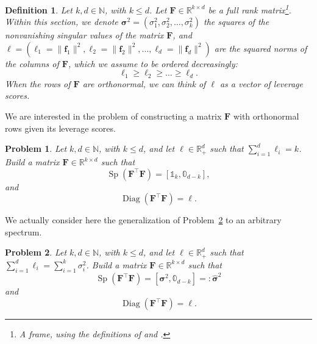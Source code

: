 \documentclass[twoside,11pt]{book}
\newtheorem{definition}{Definition}
\newtheorem{problem}{Problem}
\numberwithin{theorem}{chapter}
\numberwithin{definition}{chapter}
\numberwithin{proposition}{chapter}
\numberwithin{corollary}{chapter}
\numberwithin{example}{chapter}
\numberwithin{lemma}{chapter}
\numberwithin{assumption}{chapter}
\numberwithin{equation}{chapter}
\numberwithin{figure}{chapter}
\DeclareMathOperator{\Sp}{\mathrm{Sp}}
\DeclareMathOperator{\Diag}{\mathrm{Diag}}
\DeclareMathOperator{\Tran}{\intercal}
\begin{document}
\begin{subappendices}
\begin{definition}
Let $k, d \in \mathbb{N}$, with $k \leq d$. Let $\bm{F} \in \mathbb{R}^{k \times d}$ be a full rank matrix\footnote{A \emph{frame}, using the definitions of \parencite{FiMiPo11} and \parencite{FMPS13}.}.
Within this section, we denote $\bm{\sigma}^2 = (\sigma_{1}^2, \sigma_{2}^2, \dots ,\sigma_{k}^2)$ the squares of the nonvanishing singular values of the matrix $\bm{F}$, and $\bm{\ell} = (\ell_{1}=\|\bm{f}_{1}\|^{2}, \ell_{2}=\|\bm{f}_{2}\|^{2}, \dots, \ell_{d}=\|\bm{f}_{d}\|^{2})$ are the squared norms of the columns of $\bm{F}$, which we assume to be ordered decreasingly:
$$\ell_{1} \geq \ell_{2} \geq \dots \geq \ell_{d}.$$
 When the rows of $\bm{F}$ are orthonormal, we can think of $\bm{\ell}$ as a vector of leverage scores.
\end{definition}

We are interested in the problem of constructing a matrix $\bm{F}$ with orthonormal rows given its leverage scores.
\begin{problem}\label{prob:orthogonal_frame_existence}
Let $k,d \in \mathbb{N}$, with $k \leq d$, and let $\bm{\ell} \in \mathbb{R}_{+}^{d}$ such that $\sum\limits_{i =1}^{d} \ell_{i} = k$. Build a matrix $\bm{F} \in \mathbb{R}^{k\times d}$ such that
\begin{equation}
\Sp(\bm{F}^{\Tran}\bm{F}) = [\mathbb{1}_{k},\mathbb{0}_{d-k}],
\end{equation}
and
\begin{equation}
\Diag(\bm{F}^{\Tran}\bm{F}) = \bm{\ell}.
\end{equation}
\end{problem}
We actually consider here the generalization of Problem~\ref{prob:general_frame_existence} to an arbitrary spectrum.

\begin{problem}\label{prob:general_frame_existence}
Let $k,d \in \mathbb{N}$, with $k \leq d$, and let $\bm{\ell} \in \mathbb{R}_{+}^{d}$ such that $\sum\limits_{i =1}^{d} \ell_{i} = \sum\limits_{i = 1}^{k} \sigma_{i}^2$. Build a matrix $\bm{F} \in \mathbb{R}^{k\times d}$ such that
\begin{equation}
\Sp(\bm{F}^{\Tran}\bm{F}) = [\bm{\sigma}^2,\mathbb{0}_{d-k}] =:\bm{\hat\sigma}^2
\end{equation}
and
\begin{equation}
\Diag(\bm{F}^{\Tran}\bm{F}) = \bm{\ell}.
\end{equation}
\end{problem}


\end{subappendices}
\end{document}
